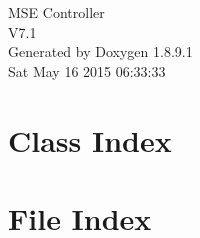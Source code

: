 \documentclass[twoside]{book}
\newcommand{\+}{\discretionary{\mbox{\scriptsize$\hookleftarrow$}}{}{}}
\newcommand{\clearemptydoublepage}{%
  \newpage{\pagestyle{empty}\cleardoublepage}%
}
\begin{document}
\hypersetup{pageanchor=false,
             bookmarks=true,
             bookmarksnumbered=true,
             pdfencoding=unicode
            }
\begin{titlepage}
\vspace*{7cm}
\begin{center}%
{\Large M\+S\+E Controller \\[1ex]\large V7.\+1 }\\
\vspace*{1cm}
{\large Generated by Doxygen 1.8.9.1}\\
\vspace*{0.5cm}
{\small Sat May 16 2015 06:33:33}\\
\end{center}
\end{titlepage}
\clearemptydoublepage
\tableofcontents
\clearemptydoublepage
{}
\hypersetup{pageanchor=true}

\chapter{Class Index}

\chapter{File Index}

\end{document}
